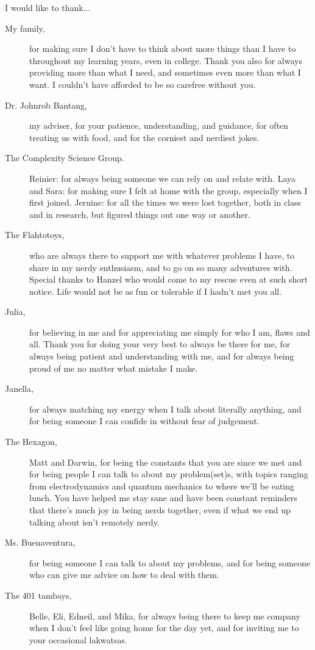 I would like to thank...
\begin{description}
    \item[My family,] for making sure I don't have to think about more things than I have to throughout my learning years, even in college. Thank you also for always providing more than what I need, and sometimes even more than what I want. I couldn't have afforded to be so carefree without you.
    \item[Dr. Johnrob Bantang,] my adviser, for your patience, understanding, and guidance, for often treating us with food, and for the corniest and nerdiest jokes.
    \item[The Complexity Science Group.] Reinier: for always being someone we can rely on and relate with. Laya and Sara: for making sure I felt at home with the group, especially when I first joined. Jeruine: for all the times we were lost together, both in class and in research, but figured things out one way or another.
    \item[The Flahtotoys,] who are always there to support me with whatever problems I have, to share in my nerdy enthusiasm, and to go on so many adventures with. Special thanks to Hanzel who would come to my rescue even at such short notice. Life would not be as fun or tolerable if I hadn't met you all.
    \item[Julia,] for believing in me and for appreciating me simply for who I am, flaws and all. Thank you for doing your very best to always be there for me, for always being patient and understanding with me, and for always being proud of me no matter what mistake I make.
    \item[Janella,] for always matching my energy when I talk about literally anything, and for being someone I can confide in without fear of judgement.
    \item[The Hexagon,] Matt and Darwin, for being the constants that you are since we met and for being people I can talk to about my problem(set)s, with topics ranging from electrodynamics and quantum mechanics to where we'll be eating lunch. You have helped me stay sane and have been constant reminders that there's much joy in being nerds together, even if what we end up talking about isn't remotely nerdy.
    \item[Ms. Buenaventura,] for being someone I can talk to about my problems, and for being someone who can give me advice on how to deal with them.
    \item[The 401 tambays,] Belle, Eli, Edneil, and Mika, for always being there to keep me company when I don't feel like going home for the day yet, and for inviting me to your occasional lakwatsas.

\end{description}
